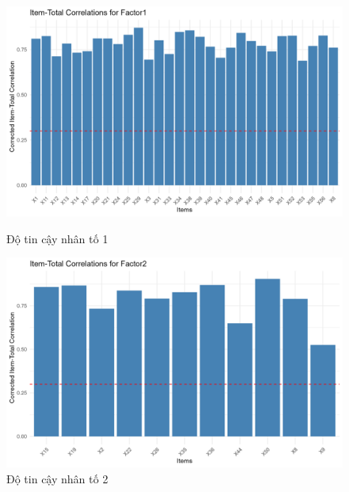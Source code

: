 \begin{figure}[h!]
    \centering
    \begin{minipage}{0.45\textwidth}
        \centering
        \includegraphics[width=\textwidth]{../../assets/images/reliability_Factor1.png}
        \caption{Độ tin cậy nhân tố 1}
    \end{minipage}
    \hfill
    \begin{minipage}{0.45\textwidth}
        \centering
        \includegraphics[width=\textwidth]{../../assets/images/reliability_Factor2.png}
        \caption{Độ tin cậy nhân tố 2}
    \end{minipage}
\end{figure}

